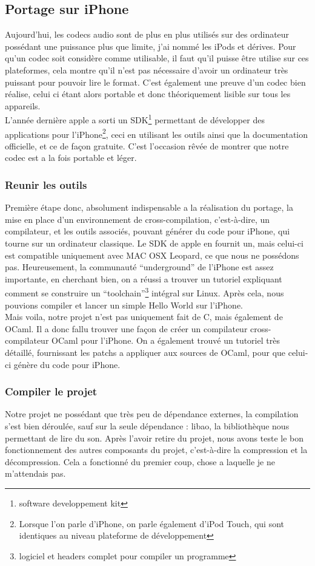 \documentclass[a4paper,12pt]{article}
\begin{document}
	\subsection{Portage sur iPhone}
Aujourd'hui, les codecs audio sont de plus en plus utilisés sur des
ordinateur possédant une puissance plus que limite, j'ai nommé les iPods
et dérives. Pour qu'un codec soit considère comme utilisable, il faut
qu'il puisse être utilise sur ces plateformes, cela montre qu'il n'est
pas nécessaire d'avoir un ordinateur très puissant pour pouvoir lire le
format. C'est également une preuve d'un codec bien réalise, celui ci
étant alors portable et donc théoriquement lisible sur tous les
appareils.\\
L'année dernière apple a sorti un SDK\footnote{software developpement
kit} permettant de développer des applications pour l'iPhone\footnote{Lorsque
l'on parle d'iPhone, on parle également d'iPod Touch, qui sont identiques au
niveau plateforme de développement}, ceci en
utilisant les outils ainsi que la documentation officielle, et ce de façon gratuite.
C'est l'occasion rêvée de montrer que notre codec est a la fois
portable et léger.\\
		\subsubsection{Reunir les outils}
Première étape donc, absolument indispensable a la réalisation du
portage, la mise en place d'un environnement de cross-compilation,
c'est-à-dire, un compilateur, et les outils associés,  pouvant générer du code
pour iPhone, qui
tourne sur un ordinateur classique. Le SDK de apple en fournit un, mais
celui-ci est compatible uniquement avec MAC OSX Leopard, ce que nous ne
possédons pas. Heureusement, la communauté ``underground'' de l'iPhone
est assez importante, en cherchant bien, on a réussi a trouver un
tutoriel expliquant comment se construire un
``toolchain''\footnote{logiciel et headers complet pour compiler un
programme} intégral sur Linux. Après cela, nous pouvions compiler et lancer un
simple Hello World sur l'iPhone.\\
Mais voila, notre projet n'est pas uniquement fait de C, mais également
de OCaml. Il a donc fallu trouver une façon de créer un compilateur
cross-compilateur OCaml
pour l'iPhone. On a également trouvé un tutoriel très détaillé, fournissant les
patchs a appliquer aux sources de OCaml, pour que celui-ci génère du code pour
iPhone.
		\subsubsection{Compiler le projet}
Notre projet ne possédant que très peu de dépendance externes, la
compilation s'est bien déroulée, sauf sur la seule dépendance : libao, la
bibliothèque nous permettant de lire du son. Après l'avoir retire du
projet, nous avons teste le bon fonctionnement des autres composants du
projet, c'est-à-dire la compression et la décompression. Cela a
fonctionné du premier coup, chose a laquelle je ne m'attendais pas.\\
\end{document}
